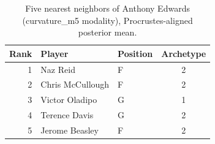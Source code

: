 \begin{table}[htbp]
  \centering\small
  \begin{tabular}{rllc}
    \toprule
    Rank & Player & Position & Archetype \\
    \midrule
    1 & Naz Reid & F & 2 \\
    2 & Chris McCullough & F & 2 \\
    3 & Victor Oladipo & G & 1 \\
    4 & Terence Davis & G & 2 \\
    5 & Jerome Beasley & F & 2 \\
    \bottomrule
  \end{tabular}
  \caption{Five nearest neighbors of Anthony Edwards (curvature_m5 modality), Procrustes-aligned posterior mean.}
  \label{tab:Anthony_Edwards_neighbors_curvature_m5}
\end{table}

